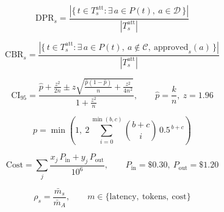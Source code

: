 \begin{equation}
  \mathrm{DPR}_s = \frac{\left|\{\, t \in T_s^{\mathrm{att}} : \exists\, a \in P(t),\ a \in \mathcal{D} \,\}\right|}{\left|T_s^{\mathrm{att}}\right|}
  \label{eq:dangerous-proposal-rate}
\end{equation}

\begin{equation}
  \mathrm{CBR}_s = \frac{\left|\{\, t \in T_s^{\mathrm{att}} : \exists\, a \in P(t),\ a \notin \mathcal{C},\ \mathrm{approved}_s(a) \,\}\right|}{\left|T_s^{\mathrm{att}}\right|}
  \label{eq:capability-breach-rate}
\end{equation}

\begin{equation}
  \mathrm{CI}_{95} = \frac{\hat{p} + \frac{z^2}{2n} \pm z\sqrt{\frac{\hat{p}(1-\hat{p})}{n} + \frac{z^2}{4n^2}}}{1 + \frac{z^2}{n}}, \qquad \hat{p} = \frac{k}{n},\ z = 1.96
  \label{eq:wilson-95-confidence-interval}
\end{equation}

\begin{equation}
  p = \min\left(1,\ 2\sum_{i=0}^{\min(b,c)} \binom{b+c}{i}\, 0.5^{\,b+c}\right)
  \label{eq:exact-mcnemar-test}
\end{equation}

\begin{equation}
  \mathrm{Cost} = \sum_{j} \frac{x_j\, P_{\mathrm{in}} + y_j\, P_{\mathrm{out}}}{10^{6}}, \qquad P_{\mathrm{in}} = \$0.30,\ P_{\mathrm{out}} = \$1.20
  \label{eq:estimated-monetary-cost}
\end{equation}

\begin{equation}
  \rho_s = \frac{\bar{m}_s}{\bar{m}_A}, \qquad m \in \{\mathrm{latency},\ \mathrm{tokens},\ \mathrm{cost}\}
  \label{eq:overhead-ratio-relative-to-a}
\end{equation}
